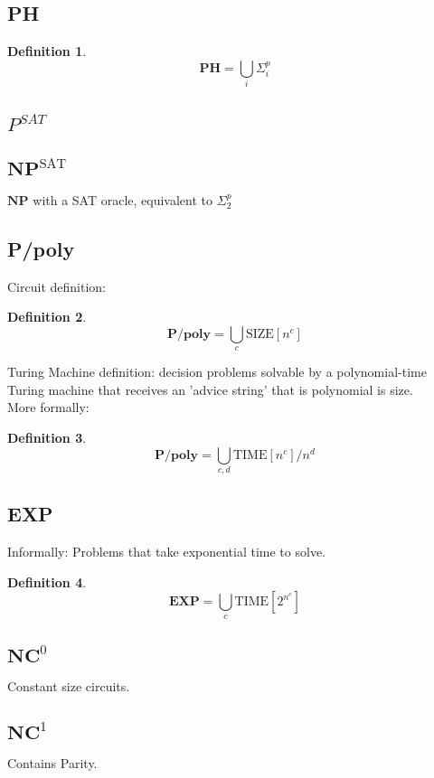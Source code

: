 \documentclass[]{article}
\theoremstyle{break}
\theoremstyle{break}
\newtheorem{definition}{Definition}[section]
\begin{document}
\subsection{PH}
\label{sec:PH}
\begin{definition}
	$$\textbf{PH} =\bigcup_i\hyperref[sec:sigmapi]{\Sigma_{i}^p}$$
\end{definition}

\subsection{$P^{SAT}$}

\subsection{$\textbf{NP}^{\text{SAT}}$}
\label{sec:npsat}
$\textbf{NP}$ with a SAT oracle, equivalent to $\hyperref[sec:sigmap2]{\Sigma_2^p}$

\subsection{P/poly}
\label{sec:ppoly}
Circuit definition:
\begin{definition}
	$$\textbf{P/poly} = \bigcup_c \hyperref[sec:size]{\text{SIZE}[n^c]}$$
\end{definition}
$ $
\\
Turing Machine definition: decision problems solvable by a polynomial-time Turing machine that receives an 'advice string' that is polynomial is size.
\\
More formally:
\begin{definition}
		$$\textbf{P/poly} = \bigcup_{c,d} \hyperref[sec:time]{\text{TIME}[n^c]}/n^d$$
\end{definition}
\subsection{EXP}
Informally: Problems that take exponential time to solve.
\begin{definition}
	$$\textbf{EXP}= \bigcup_c \hyperref[sec:time]{\text{TIME}[2^{n^c}]}$$
\end{definition}
\subsection{$\textbf{NC}^0$}
\label{sec:NC0}
Constant size circuits.
\subsection{$\textbf{NC}^1$}
\label{sec:NC1}
Contains Parity.
\end{document}
